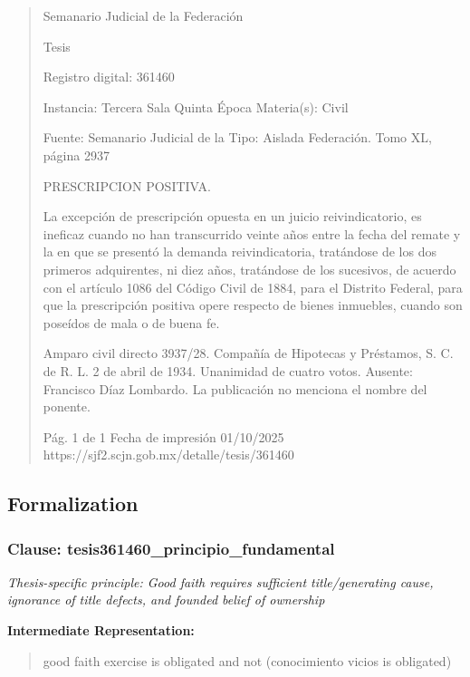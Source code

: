 \documentclass[11pt,a4paper]{article}
\begin{document}
\begin{quote}
                                                   Semanario Judicial de la Federación

                                                  Tesis

 Registro digital: 361460

 Instancia: Tercera Sala          Quinta Época                         Materia(s): Civil

                                  Fuente: Semanario Judicial de la     Tipo: Aislada
                                  Federación.
                                  Tomo XL, página 2937


PRESCRIPCION POSITIVA.


La excepción de prescripción opuesta en un juicio reivindicatorio, es ineficaz cuando no han
transcurrido veinte años entre la fecha del remate y la en que se presentó la demanda
reivindicatoria, tratándose de los dos primeros adquirentes, ni diez años, tratándose de los
sucesivos, de acuerdo con el artículo 1086 del Código Civil de 1884, para el Distrito Federal, para
que la prescripción positiva opere respecto de bienes inmuebles, cuando son poseídos de mala o de
buena fe.


Amparo civil directo 3937/28. Compañía de Hipotecas y Préstamos, S. C. de R. L. 2 de abril de
1934. Unanimidad de cuatro votos. Ausente: Francisco Díaz Lombardo. La publicación no menciona
el nombre del ponente.




                                             Pág. 1 de 1             Fecha de impresión 01/10/2025
  https://sjf2.scjn.gob.mx/detalle/tesis/361460

\end{quote}

\subsection{Formalization}

\subsubsection{Clause: tesis361460\_principio\_fundamental}

\textit{Thesis-specific principle: Good faith requires sufficient title/generating cause, ignorance of title defects, and founded belief of ownership}

\textbf{Intermediate Representation:}

\begin{quote}
good faith exercise is obligated and not (conocimiento vicios is obligated)
\end{quote}
\end{document}
